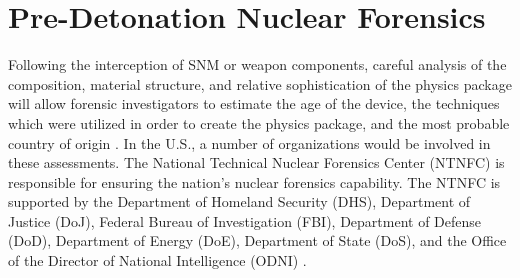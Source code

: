 \documentclass{report}
\begin{document}
% 
% 
% 
% 


\section{Pre-Detonation Nuclear Forensics}

Following the interception of SNM or weapon components, careful analysis of the composition, material structure, and relative sophistication of the physics package will allow forensic investigators to estimate the age of the device, the techniques which were utilized in order to create the physics package, and the most probable country of origin \cite{Glaser2008}. In the U.S., a number of organizations would be involved in these assessments. The National Technical Nuclear Forensics Center (NTNFC) is responsible for ensuring the nation's nuclear forensics capability.  The NTNFC is supported by the Department of Homeland Security (DHS), Department of Justice (DoJ), Federal Bureau of Investigation (FBI), Department of Defense (DoD), Department of Energy (DoE), Department of State (DoS), and the Office of the Director of National Intelligence (ODNI) \cite{DepartmentOfHomelandSecurit}. 
\end{document}
